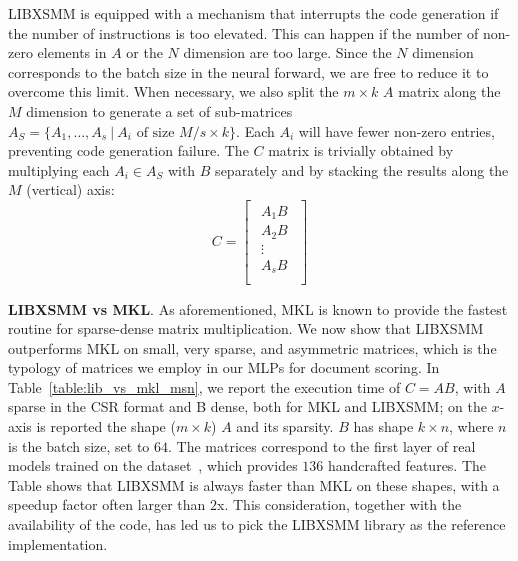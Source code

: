 LIBXSMM is equipped with a mechanism that interrupts the code generation if the number of instructions is too elevated. This can happen if the number of non-zero elements in $A$ or the $N$ dimension are too large. Since the $N$ dimension corresponds to the batch size in the neural forward, we are free to  reduce it to overcome this limit. When necessary, we also split the $m \times k $ $A$ matrix along the $M$ dimension to generate a set of sub-matrices $A_S = \{A_1, \dots, A_s \ | \  A_i \text{ of size }  M/s \times k  \}$. Each $A_i$ will have fewer non-zero entries, preventing code generation failure. 
The $C$ matrix is trivially obtained by multiplying each $A_i \in A_S$ with $B$ separately and by stacking the results along the $M$ (vertical) axis:
\[ C = 
  \begin{bmatrix}
    \begin{array}{c}
  A_1 B  \\
  \hline
  A_2 B\\
  \hline 
  \vdots\\
  \hline
  A_s B\\	   
    \end{array}
  \end{bmatrix}
	\]

\smallskip
\noindent \textbf{LIBXSMM vs MKL}. As aforementioned, MKL is known to provide the fastest routine for sparse-dense matrix multiplication. We now show that LIBXSMM outperforms MKL on small, very sparse, and asymmetric matrices, which is the typology of matrices we employ in our MLPs for document scoring. In Table~\ref{table:lib_vs_mkl_msn}, we report the execution time of $C = AB$, with $A$ sparse in the CSR format and B dense, both for MKL and LIBXSMM; on the $x$-axis is reported the shape  ($m \times k $) $A$ and its sparsity. $B$ has shape $k \times n$, where $n$ is the batch size, set to $64$. The matrices correspond to the first layer of real models trained on the \msn dataset~\cite{DBLP:journals/corr/QinL13}, which provides $136$ handcrafted features. The Table shows that LIBXSMM is always faster than MKL on these shapes, with a speedup factor often larger than $2$x. This consideration, together with the availability of the code, has led us to pick the LIBXSMM library as the reference implementation. 

